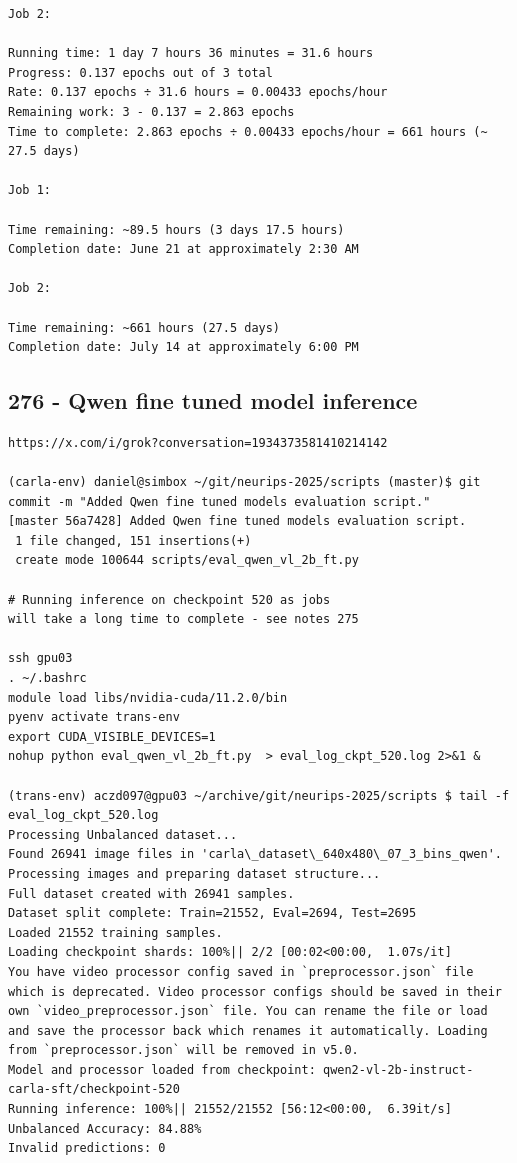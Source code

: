 \begin{verbatim}
Job 2:

Running time: 1 day 7 hours 36 minutes = 31.6 hours
Progress: 0.137 epochs out of 3 total
Rate: 0.137 epochs ÷ 31.6 hours = 0.00433 epochs/hour
Remaining work: 3 - 0.137 = 2.863 epochs
Time to complete: 2.863 epochs ÷ 0.00433 epochs/hour = 661 hours (~ 27.5 days)

Job 1:

Time remaining: ~89.5 hours (3 days 17.5 hours)
Completion date: June 21 at approximately 2:30 AM

Job 2:

Time remaining: ~661 hours (27.5 days)
Completion date: July 14 at approximately 6:00 PM

\end{verbatim}

\subsection{276 - Qwen fine tuned model inference}
\label{app_res:276}

\begin{verbatim}
https://x.com/i/grok?conversation=1934373581410214142

(carla-env) daniel@simbox ~/git/neurips-2025/scripts (master)$ git commit -m "Added Qwen fine tuned models evaluation script."
[master 56a7428] Added Qwen fine tuned models evaluation script.
 1 file changed, 151 insertions(+)
 create mode 100644 scripts/eval_qwen_vl_2b_ft.py

# Running inference on checkpoint 520 as jobs
will take a long time to complete - see notes 275

ssh gpu03
. ~/.bashrc
module load libs/nvidia-cuda/11.2.0/bin
pyenv activate trans-env
export CUDA_VISIBLE_DEVICES=1
nohup python eval_qwen_vl_2b_ft.py  > eval_log_ckpt_520.log 2>&1 &

(trans-env) aczd097@gpu03 ~/archive/git/neurips-2025/scripts $ tail -f eval_log_ckpt_520.log
Processing Unbalanced dataset...
Found 26941 image files in 'carla\_dataset\_640x480\_07_3_bins_qwen'.
Processing images and preparing dataset structure...
Full dataset created with 26941 samples.
Dataset split complete: Train=21552, Eval=2694, Test=2695
Loaded 21552 training samples.
Loading checkpoint shards: 100%|| 2/2 [00:02<00:00,  1.07s/it]
You have video processor config saved in `preprocessor.json` file which is deprecated. Video processor configs should be saved in their own `video_preprocessor.json` file. You can rename the file or load and save the processor back which renames it automatically. Loading from `preprocessor.json` will be removed in v5.0.
Model and processor loaded from checkpoint: qwen2-vl-2b-instruct-carla-sft/checkpoint-520
Running inference: 100%|| 21552/21552 [56:12<00:00,  6.39it/s] 
Unbalanced Accuracy: 84.88%
Invalid predictions: 0

    
\end{verbatim}
